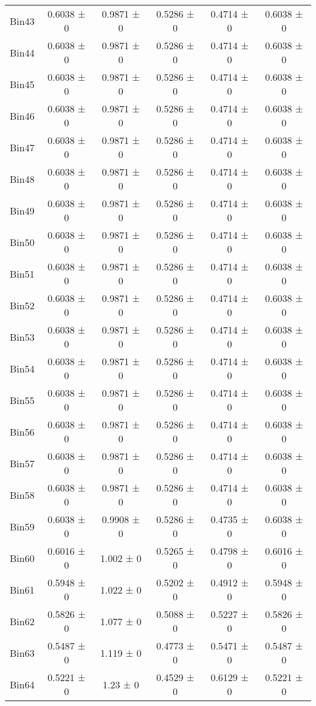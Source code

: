 \begin{tabular}{@{\extracolsep{4pt}}lccccc@{}}
     Bin43 & 0.6038 ± 0 & 0.9871 ± 0 & 0.5286 ± 0 & 0.4714 ± 0 & 0.6038 ± 0 \\ 
     Bin44 & 0.6038 ± 0 & 0.9871 ± 0 & 0.5286 ± 0 & 0.4714 ± 0 & 0.6038 ± 0 \\ 
     Bin45 & 0.6038 ± 0 & 0.9871 ± 0 & 0.5286 ± 0 & 0.4714 ± 0 & 0.6038 ± 0 \\ 
     Bin46 & 0.6038 ± 0 & 0.9871 ± 0 & 0.5286 ± 0 & 0.4714 ± 0 & 0.6038 ± 0 \\ 
     Bin47 & 0.6038 ± 0 & 0.9871 ± 0 & 0.5286 ± 0 & 0.4714 ± 0 & 0.6038 ± 0 \\ 
     Bin48 & 0.6038 ± 0 & 0.9871 ± 0 & 0.5286 ± 0 & 0.4714 ± 0 & 0.6038 ± 0 \\ 
     Bin49 & 0.6038 ± 0 & 0.9871 ± 0 & 0.5286 ± 0 & 0.4714 ± 0 & 0.6038 ± 0 \\ 
     Bin50 & 0.6038 ± 0 & 0.9871 ± 0 & 0.5286 ± 0 & 0.4714 ± 0 & 0.6038 ± 0 \\ 
     Bin51 & 0.6038 ± 0 & 0.9871 ± 0 & 0.5286 ± 0 & 0.4714 ± 0 & 0.6038 ± 0 \\ 
     Bin52 & 0.6038 ± 0 & 0.9871 ± 0 & 0.5286 ± 0 & 0.4714 ± 0 & 0.6038 ± 0 \\ 
     Bin53 & 0.6038 ± 0 & 0.9871 ± 0 & 0.5286 ± 0 & 0.4714 ± 0 & 0.6038 ± 0 \\ 
     Bin54 & 0.6038 ± 0 & 0.9871 ± 0 & 0.5286 ± 0 & 0.4714 ± 0 & 0.6038 ± 0 \\ 
     Bin55 & 0.6038 ± 0 & 0.9871 ± 0 & 0.5286 ± 0 & 0.4714 ± 0 & 0.6038 ± 0 \\ 
     Bin56 & 0.6038 ± 0 & 0.9871 ± 0 & 0.5286 ± 0 & 0.4714 ± 0 & 0.6038 ± 0 \\ 
     Bin57 & 0.6038 ± 0 & 0.9871 ± 0 & 0.5286 ± 0 & 0.4714 ± 0 & 0.6038 ± 0 \\ 
     Bin58 & 0.6038 ± 0 & 0.9871 ± 0 & 0.5286 ± 0 & 0.4714 ± 0 & 0.6038 ± 0 \\ 
     Bin59 & 0.6038 ± 0 & 0.9908 ± 0 & 0.5286 ± 0 & 0.4735 ± 0 & 0.6038 ± 0 \\ 
     Bin60 & 0.6016 ± 0 & 1.002 ± 0 & 0.5265 ± 0 & 0.4798 ± 0 & 0.6016 ± 0 \\ 
     Bin61 & 0.5948 ± 0 & 1.022 ± 0 & 0.5202 ± 0 & 0.4912 ± 0 & 0.5948 ± 0 \\ 
     Bin62 & 0.5826 ± 0 & 1.077 ± 0 & 0.5088 ± 0 & 0.5227 ± 0 & 0.5826 ± 0 \\ 
     Bin63 & 0.5487 ± 0 & 1.119 ± 0 & 0.4773 ± 0 & 0.5471 ± 0 & 0.5487 ± 0 \\ 
     Bin64 & 0.5221 ± 0 & 1.23 ± 0 & 0.4529 ± 0 & 0.6129 ± 0 & 0.5221 ± 0 \\ 

\end{tabular}
